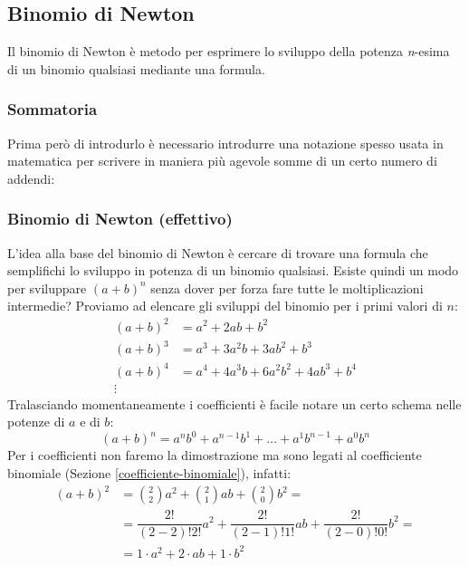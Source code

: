 \subsection{Binomio di Newton} \label{BinomioNewton}
Il binomio di Newton è metodo per esprimere lo sviluppo della potenza \textit{n}-esima di un binomio qualsiasi mediante una formula.
\subsubsection{Sommatoria} \label{sommatoria}
Prima però di introdurlo è necessario introdurre una notazione spesso usata in matematica per scrivere in maniera più agevole somme di un certo numero di addendi:

\subsubsection{Binomio di Newton (effettivo)}
L'idea alla base del binomio di Newton è cercare di trovare una formula che semplifichi lo sviluppo in potenza di un binomio qualsiasi. Esiste quindi un modo per sviluppare $(a+b)^n$ senza dover per forza fare tutte le moltiplicazioni intermedie? Proviamo ad elencare gli sviluppi del binomio per i primi valori di $n$:
\begin{align*}
    (a+b)^2 &= a^2 + 2ab + b^2\\
    (a+b)^3 &= a^3 + 3a^2b + 3ab^2 + b^3\\
    (a+b)^4 &= a^4 + 4a^3b + 6a^2b^2 + 4ab^3 + b^4\\
    \vdots \qquad
\end{align*}
Tralasciando momentaneamente i coefficienti è facile notare un certo schema nelle potenze di $a$ e di $b$:
\begin{equation*}
    (a+b)^n = a^nb^0 + a^{n-1}b^1 + \dots + a^1b^{n-1} + a^0b^n
\end{equation*}
Per i coefficienti non faremo la dimostrazione ma sono legati al coefficiente binomiale (Sezione \ref{coefficiente-binomiale}), infatti:
\begin{align*}
    (a+b)^2 &= \binom{2}{2}a^2 + \binom{2}{1}ab + \binom{2}{0}b^2 = \\[2pt]
    &= \dfrac{2!}{(2-2)!2!}a^2 + \dfrac{2!}{(2-1)!1!}ab + \dfrac{2!}{(2-0)!0!}b^2 =\\[5pt]
    &= 1\cdot a^2 + 2\cdot ab + 1 \cdot b^2
\end{align*}

